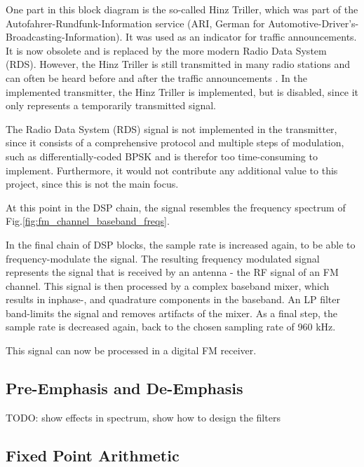 One part in this block diagram is the so-called Hinz Triller, which was part of the Autofahrer-Rundfunk-Information service (ARI, German for Automotive-Driver's-Broadcasting-Information).
It was used as an indicator for traffic announcements.
It is now obsolete and is replaced by the more modern Radio Data System (RDS).
However, the Hinz Triller is still transmitted in many radio stations and can often be heard before and after the traffic announcements \cite{HinzTriller}.
In the implemented transmitter, the Hinz Triller is implemented, but is disabled, since it only represents a temporarily transmitted signal.

The Radio Data System (RDS) signal is not implemented in the transmitter, since it consists of a comprehensive protocol and multiple steps of modulation, such as differentially-coded BPSK \cite{IntroFmStereoRdsModulation} and is therefor too time-consuming to implement.
Furthermore, it would not contribute any additional value to this project, since this is not the main focus.

At this point in the DSP chain, the signal resembles the frequency spectrum of Fig.\ref{fig:fm_channel_baseband_freqs}.

In the final chain of DSP blocks, the sample rate is increased again, to be able to frequency-modulate the signal.
The resulting frequency modulated signal represents the signal that is received by an antenna - the RF signal of an FM channel.
This signal is then processed by a complex baseband mixer, which results in inphase-, and quadrature components in the baseband.
An LP filter band-limits the signal and removes artifacts of the mixer.
As a final step, the sample rate is decreased again, back to the chosen sampling rate of 960 kHz.

This signal can now be processed in a digital FM receiver.

\subsection{Pre-Emphasis and De-Emphasis}
TODO: show effects in spectrum, show how to design the filters

\subsection{Fixed Point Arithmetic}

